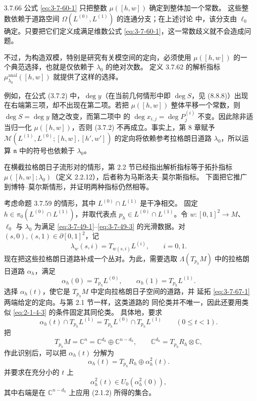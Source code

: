 \begin{remark}{3.7.66}\label{rem:3-7-66}
公式 \eqref{eq:3-7-60-1} 只把整数 $\mu([h,w])$ 确定到整体加一个常数。
这些整数依赖于道路空间 $\Omega(L^{(0)},L^{(1)})$ 的连通分支；在上述讨论
中，该分支由 $\ell_0$ 确定。只要把它们定义成满足维数公式
\eqref{eq:3-7-60-1}，这一常数歧义就不会造成问题。

不过，为构造双模，特别是研究有关模空间的定向，必须使用
$\mu([h,w])$ 的一个典范选择，也就是仅依赖于 $\lambda_0$ 的绝对次数。
定义 3.7.62 的解析指标
$\mu_{\lambda_0}^{\mathrm{anal}}([h,w])$ 就提供了这样的选择。

例如，在公式 (3.7.2) 中，$\deg y$（在当前几何情形中即
$\deg S$，见 (8.8.8)）出现在右端第三项，却不出现在第二项。若把
$\mu([h,w])$ 整体平移一个常数，则 $\deg S=\deg y$ 随之改变，而第二项中
的 $\deg x_{i,j}=\deg P_j^{(i)}$ 不变。因此除非适当归一化
$\mu([h,w])$，否则 (3.7.2) 不再成立。事实上，第 8 章赋予
$\mathcal M(L^{(1)},L^{(0)};[h,w],[h',w'])$ 的定向将依赖参考拉格朗日道路
$\lambda_0$，所以运算 $\mathfrak n$ 中的符号也依赖于 $\lambda_0$。
\end{remark}

在横截拉格朗日子流形对的情形，第 2.2 节已经指出解析指标等于拓扑指标
$\mu([h,w];\lambda_0)$（定义 2.2.12），后者称为马斯洛夫--莫尔斯指标。
下面把它推广到博特--莫尔斯情形，并证明两种指标仍然相等。

考虑命题 3.7.59 的情形，其中 $L^{(0)}\cap L^{(1)}$ 是干净相交。
固定 $h\in\pi_0(L^{(0)}\cap L^{(1)})$，并取代表点
$p_h\in L^{(0)}\cap L^{(1)}$。令
$w\colon[0,1]^2\to M$、$\ell_0$ 与 $\lambda_0$ 为满足
\eqref{eq:3-7-49-1}--\eqref{eq:3-7-49-3} 的光滑数据。对
$(s,0),(s,1)\in\partial[0,1]^2$，记
\[
 \lambda_w(s,i)=T_{w(s,i)}L^{(i)},\qquad i=0,1.
\]
现在把这些拉格朗日道路补成一个丛对。为此，需要选取
$\Lambda(T_{p_h}M)$ 中的拉格朗日道路 $\alpha_h$，满足
\begin{equation}
 \alpha_h(0)=T_{p_h}L^{(0)},\qquad
 \alpha_h(1)=T_{p_h}L^{(1)}.
\tag{3.7.67.1}\label{eq:3-7-67-1}
\end{equation}
选择 $\alpha_h(t)$，使它是 $T_{p_h}M$ 中定向拉格朗日子空间的道路，并
延拓 \eqref{eq:3-7-67-1} 两端给定的定向。与第 2.1 节一样，这类道路的
同伦类并不唯一，因此还要用类似 \eqref{eq:2-1-4-3} 的条件固定其同伦类。
具体地，要求
\begin{equation}
 \alpha_h(t)\cap T_{p_h}L^{(1)}
 =
 T_{p_h}L^{(0)}\cap T_{p_h}L^{(1)}
 \qquad(0\leq t<1).
\tag{3.7.67.2}\label{eq:3-7-67-2}
\end{equation}
把
\[
 T_{p_h}M=\mathbb C^n
 =\mathbb C^{d_h}\oplus\mathbb C^{n-d_h},
 \qquad
 \mathbb C^{d_h}=T_{p_h}R_h\otimes\mathbb C,
\]
作此识别后，可以把 $\alpha_h(t)$ 分解为
\begin{equation}
 \alpha_h(t)=T_{p_h}R_h\oplus\alpha_h^2(t).
\tag{3.7.67.3}\label{eq:3-7-67-3}
\end{equation}
并要求在充分小的 $t$ 上
\begin{equation}
 \alpha_h^2(t)\in U_0(\alpha_h^2(0)),
\tag{3.7.67.4}\label{eq:3-7-67-4}
\end{equation}
其中右端是在 $\mathbb C^{n-d_h}$ 上应用 (2.1.2) 所得的集合。

